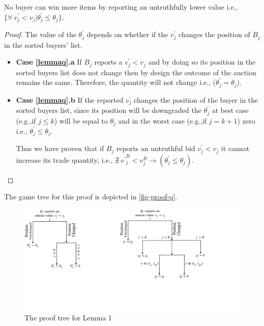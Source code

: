 



\begin{Lemma}
\label{lemmaq}
No buyer can win more items by reporting an untruthfully lower value i.e., $\{\forall \ v^\prime_j < v_j | \theta^\prime_{j} \leq \theta_{j} \}$.
\end{Lemma}
\begin{proof}
The value of the $\theta^\prime_j$ depends on whether if the $v^\prime_j$ changes the position of $B_j$ in the sorted buyers' list.
\begin{itemize}
    \item[] \textbf{Case \ref{lemmaq}.a} If $B_j$ reports a $v^\prime_j < v_j$ and by doing so its position in the sorted buyers list does not change then by design the outcome of the auction remains the same. Therefore, the quantity will not change i.e., (${\theta_{j}^\prime} = \theta_{j}$).
    \item[] \textbf{Case \ref{lemmaq}.b} If the reported $v^\prime_j$ changes the position of the buyer in the sorted buyers list, since its position will be downgraded the $\theta^\prime_{j}$ at best case (e.g.,if $j \leq k$) will be equal to $\theta_{j}$ and in the worst case (e.g.,if $j=k+1$) zero i.e., ${\theta_{j}^\prime} \leq \theta_{j}$.


Thus we have proven that if $B_j$ reports an untruthful bid $v^\prime_j < v_j$ it cannot increase its trade quantity, i.e., $\nexists \ {{v^\prime}^B_{j} < v^B_{j}}\rightarrow ({\theta_{j}^\prime} \leq \theta_{j})$.
\end{itemize}
\end{proof}
\vspace{-5mm}
The game tree for this proof is depicted in \autoref{fig-proof-q}.
\begin{figure}[htbp]
\centering
\includegraphics{Figures/proofq}
\caption{The proof tree for Lemma 1}
\label{fig-proof-q}
\vspace{-2mm}
\end{figure}
